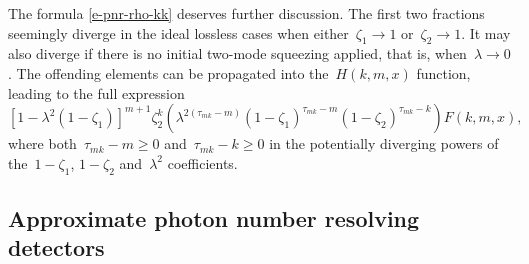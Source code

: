\documentclass{article}
\begin{document}
The formula \eqref{e-pnr-rho-kk} deserves further discussion. The first two fractions seemingly diverge in the ideal lossless cases when either~${\zeta_{1} \to 1}$ or~${\zeta_{2} \to 1}$. It may also diverge if there is no initial two-mode squeezing applied, that is, when~${\lambda \to 0}$. The offending elements can be propagated into the~$H(k, m, x)$ function, leading to the full expression
%
\begin{equation}
  { [ 1 - \lambda^{2} (1 - \zeta_{1}) ]^{m + 1} }
  { \zeta_{2}^{k} }
  \left(
    \lambda^{2 (\tau_{mk} - m)}
    (1 - \zeta_{1})^{\tau_{mk} - m}
    (1 - \zeta_{2})^{\tau_{mk} - k}
  \right)
  F (k, m, x),
\end{equation}
%
where both~${\tau_{mk} - m \geq 0}$ and~${\tau_{mk} - k \geq 0}$ in the potentially diverging powers of the~${1 - \zeta_{1}}$, ${1 - \zeta_{2}}$ and~$\lambda^{2}$ coefficients.

\subsection*{Approximate photon number resolving detectors}
\end{document}
